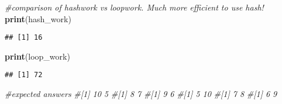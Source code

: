 \documentclass[
]{article}
\newenvironment{Shaded}{\begin{snugshade}}{\end{snugshade}}
\newcommand{\CommentTok}[1]{\textcolor[rgb]{0.56,0.35,0.01}{\textit{#1}}}
\newcommand{\FunctionTok}[1]{\textcolor[rgb]{0.13,0.29,0.53}{\textbf{#1}}}
\newcommand{\NormalTok}[1]{#1}
\begin{document}
\begin{Shaded}
\begin{Highlighting}[]
\CommentTok{\#comparison of hashwork vs loopwork. Much more efficient to use hash!}
\FunctionTok{print}\NormalTok{(hash\_work)}
\end{Highlighting}
\end{Shaded}

\begin{verbatim}
## [1] 16
\end{verbatim}

\begin{Shaded}
\begin{Highlighting}[]
\FunctionTok{print}\NormalTok{(loop\_work)}
\end{Highlighting}
\end{Shaded}

\begin{verbatim}
## [1] 72
\end{verbatim}

\begin{Shaded}
\begin{Highlighting}[]
\CommentTok{\#expected answers}
\CommentTok{\#[1] 10  5}
\CommentTok{\#[1] 8 7}
\CommentTok{\#[1] 9 6}
\CommentTok{\#[1]  5 10}
\CommentTok{\#[1] 7 8}
\CommentTok{\#[1] 6 9}
\end{Highlighting}
\end{Shaded}
\end{document}
